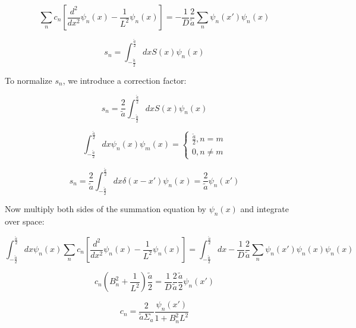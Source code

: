 \documentclass[12pt]{article}
\begin{document}
\begin{equation*}
\sum_n c_n\left[\frac{d^2}{dx^2}\psi_n(x) - \frac{1}{L^2}\psi_n(x)\right] =
-\frac{1}{D}\frac{2}{\tilde{a}}\sum_n \psi_n(x') \psi_n(x)
\end{equation*}

\begin{equation*}
s_n = \int_{-\tfrac{\tilde{a}}{2}}^{\tfrac{\tilde{a}}{2}}dxS(x)\psi_n(x)
\end{equation*}

To normalize $s_n$, we introduce a correction factor:

\begin{equation*}
s_n = \frac{2}{\tilde{a}}\int_{-\tfrac{\tilde{a}}{2}}^{\tfrac{\tilde{a}}{2}}dxS(x)\psi_n(x)
\end{equation*}

\begin{equation*}
\int_{-\tfrac{\tilde{a}}{2}}^{\tfrac{\tilde{a}}{2}}dx\psi_n(x)\psi_m(x) =\begin{cases}
	\tfrac{\tilde{a}}{2}, n = m \\
	0, n \neq m
	\end{cases}
\end{equation*}

\begin{equation*}
s_n = \frac{2}{\tilde{a}}\int_{-\tfrac{\tilde{a}}{2}}^{\tfrac{\tilde{a}}{2}}dx\delta(x-x')\psi_n(x)
= \frac{2}{\tilde{a}}\psi_n(x')
\end{equation*}

Now multiply both sides of the summation equation by $\psi_n(x)$ and integrate over space:

\begin{equation*}
\int_{-\tfrac{\tilde{a}}{2}}^{\tfrac{\tilde{a}}{2}}dx\psi_n(x)
\sum_n c_n\left[\frac{d^2}{dx^2}\psi_n(x) - \frac{1}{L^2}\psi_n(x)\right] =
\int_{-\tfrac{\tilde{a}}{2}}^{\tfrac{\tilde{a}}{2}}dx
-\frac{1}{D}\frac{2}{\tilde{a}}\sum_n \psi_n(x') \psi_n(x)\psi_n(x)
\end{equation*}

\begin{equation*}
c_n\left(B_n^2 + \frac{1}{L^2}\right)\frac{\tilde{a}}{2} = 
\frac{1}{D}\frac{2}{\tilde{a}}\frac{\tilde{a}}{2}\psi_n(x')
\end{equation*}

\begin{equation*}
c_n = \frac{2}{\tilde{a}\Sigma_a}\frac{\psi_n(x')}{1+B_n^2L^2}
\end{equation*}
\end{document}
